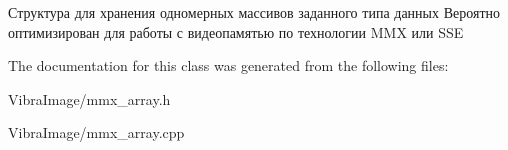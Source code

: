 Структура для хранения одномерных массивов заданного типа данных Вероятно оптимизирован для работы с видеопамятью по технологии M\+M\+X или S\+S\+E 



The documentation for this class was generated from the following files\+:\begin{DoxyCompactItemize}
\item 
Vibra\+Image/mmx\+\_\+array.\+h\item 
Vibra\+Image/mmx\+\_\+array.\+cpp\end{DoxyCompactItemize}
